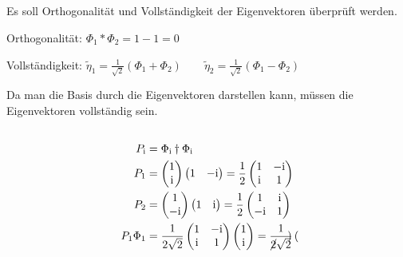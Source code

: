 \subsection{}
Es soll Orthogonalität und Vollständigkeit der Eigenvektoren überprüft werden.

Orthogonalität: $\Phi_1*\Phi_2 = 1-1 = 0$

Vollständigkeit: $\tilde{\eta}_1 = \frac 1{\sqrt 2}(\Phi_1 +\Phi_2) \qquad \tilde{\eta}_2 = \frac 1{\sqrt 2}(\Phi_1 -\Phi_2) $

Da man die Basis durch die Eigenvektoren darstellen kann, müssen die Eigenvektoren vollständig sein.

\subsection{}
\begin{align*}
    P_\mathrm i &= \Phi_\mathrm i\dagger\Phi_\mathrm i \\
    P_1 &= 
    \begin{pmatrix}
        1 \\ \mathrm i
    \end{pmatrix}\begin{pmatrix}
        1 & -\mathrm i
    \end{pmatrix} 
    = \frac 12
    \begin{pmatrix}
        1 &-\mathrm i \\
        \mathrm i &1
    \end{pmatrix} \\
     P_2 &= 
    \begin{pmatrix}
        1 \\ -\mathrm i
    \end{pmatrix}\begin{pmatrix}
        1 & \mathrm i
    \end{pmatrix} 
    = \frac 12
    \begin{pmatrix}
        1 & \mathrm i \\
        -\mathrm i & 1
    \end{pmatrix} \\
    P_1\Phi_1 &= \frac 1{2\sqrt 2}
    \begin{pmatrix}
        1 & -\mathrm i \\
        \mathrm i & 1
    \end{pmatrix} \begin{pmatrix}
        1 \\ \mathrm i 
    \end{pmatrix}
    = \frac 1{\cancel{2}\sqrt 2}\begin{pmatrix}

\end{pmatrix}
\end{align*}
